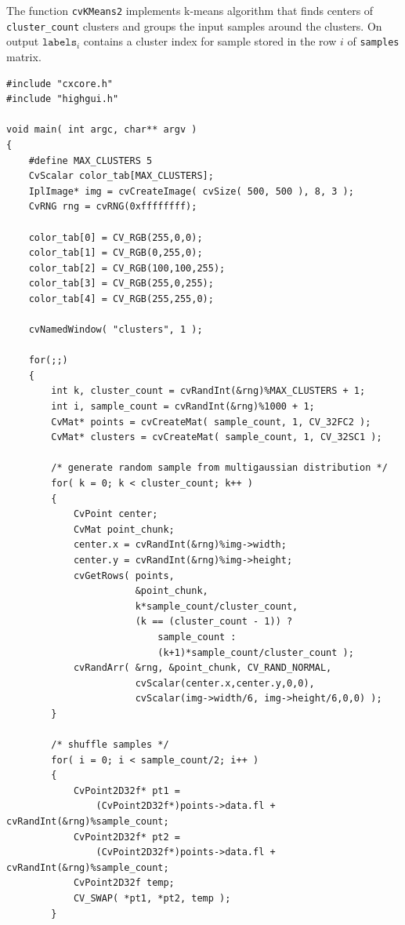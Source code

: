 The function \texttt{cvKMeans2} implements k-means algorithm that finds
centers of \texttt{cluster\_count} clusters and groups the input samples
around the clusters. On output $\texttt{labels}_i$ contains a cluster index for
sample stored in the row $i$ of \texttt{samples} matrix.

\begin{lstlisting}
#include "cxcore.h"
#include "highgui.h"

void main( int argc, char** argv )
{
    #define MAX_CLUSTERS 5
    CvScalar color_tab[MAX_CLUSTERS];
    IplImage* img = cvCreateImage( cvSize( 500, 500 ), 8, 3 );
    CvRNG rng = cvRNG(0xffffffff);

    color_tab[0] = CV_RGB(255,0,0);
    color_tab[1] = CV_RGB(0,255,0);
    color_tab[2] = CV_RGB(100,100,255);
    color_tab[3] = CV_RGB(255,0,255);
    color_tab[4] = CV_RGB(255,255,0);

    cvNamedWindow( "clusters", 1 );

    for(;;)
    {
        int k, cluster_count = cvRandInt(&rng)%MAX_CLUSTERS + 1;
        int i, sample_count = cvRandInt(&rng)%1000 + 1;
        CvMat* points = cvCreateMat( sample_count, 1, CV_32FC2 );
        CvMat* clusters = cvCreateMat( sample_count, 1, CV_32SC1 );

        /* generate random sample from multigaussian distribution */
        for( k = 0; k < cluster_count; k++ )
        {
            CvPoint center;
            CvMat point_chunk;
            center.x = cvRandInt(&rng)%img->width;
            center.y = cvRandInt(&rng)%img->height;
            cvGetRows( points,
                       &point_chunk,
                       k*sample_count/cluster_count,
                       (k == (cluster_count - 1)) ?
                           sample_count :
                           (k+1)*sample_count/cluster_count );
            cvRandArr( &rng, &point_chunk, CV_RAND_NORMAL,
                       cvScalar(center.x,center.y,0,0),
                       cvScalar(img->width/6, img->height/6,0,0) );
        }

        /* shuffle samples */
        for( i = 0; i < sample_count/2; i++ )
        {
            CvPoint2D32f* pt1 =
                (CvPoint2D32f*)points->data.fl + cvRandInt(&rng)%sample_count;
            CvPoint2D32f* pt2 =
                (CvPoint2D32f*)points->data.fl + cvRandInt(&rng)%sample_count;
            CvPoint2D32f temp;
            CV_SWAP( *pt1, *pt2, temp );
        }


\end{lstlisting}
